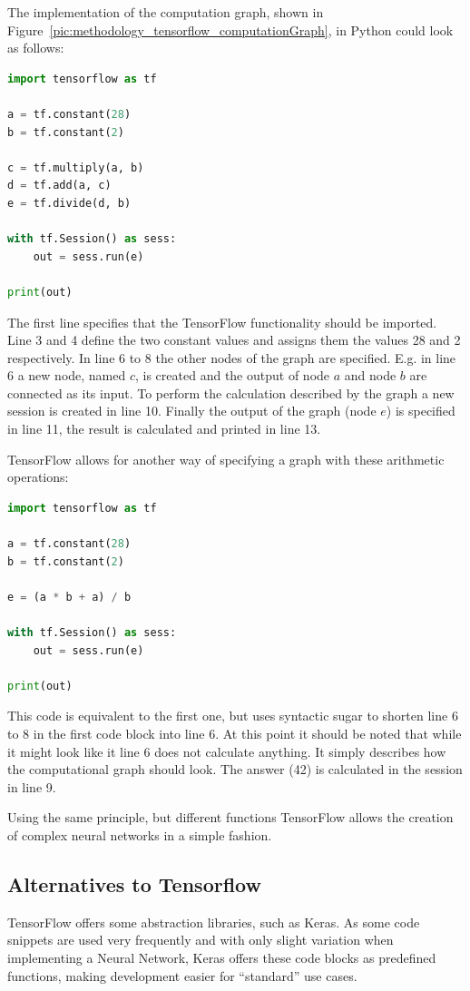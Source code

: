 The implementation of the computation graph, shown in Figure~\ref{pic:methodology_tensorflow_computationGraph}, in Python could look as follows:

\begin{lstlisting}[language=python]
import tensorflow as tf

a = tf.constant(28)
b = tf.constant(2)

c = tf.multiply(a, b)
d = tf.add(a, c)
e = tf.divide(d, b)

with tf.Session() as sess:
    out = sess.run(e)

print(out)
\end{lstlisting}

The first line specifies that the TensorFlow functionality should be imported. Line 3 and 4 define the two constant values and assigns them the values 28 and 2 respectively. In line 6 to 8 the other nodes of the graph are specified. E.g. in line 6 a new node, named $c$, is created and the output of node $a$ and node $b$ are connected as its input. To perform the calculation described by the graph a new session is created in line 10. Finally the output of the graph (node $e$) is specified in line 11, the result is calculated and printed in line 13.

TensorFlow allows for another way of specifying a graph with these arithmetic operations:

\begin{lstlisting}[language=python]
import tensorflow as tf

a = tf.constant(28)
b = tf.constant(2)

e = (a * b + a) / b

with tf.Session() as sess:
    out = sess.run(e)

print(out)
\end{lstlisting}

This code is equivalent to the first one, but uses syntactic sugar to shorten line 6 to 8 in the first code block into line 6. At this point it should be noted that while it might look like it line 6 does not calculate anything. It simply describes how the computational graph should look. The answer (42) is calculated in the session in line 9.

Using the same principle, but different functions TensorFlow allows the creation of complex neural networks in a simple fashion.

\subsection{Alternatives to Tensorflow}
TensorFlow offers some abstraction libraries, such as Keras. As some code snippets are used very frequently and with only slight variation when implementing a Neural Network, Keras offers these code blocks as predefined functions, making development easier for ``standard'' use cases.

